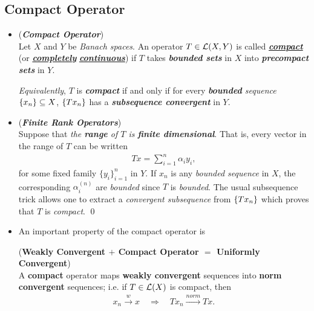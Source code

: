\documentclass[11pt]{article}
\begin{document}
\subsection{Compact Operator}
\begin{itemize}
\item \begin{definition} (\emph{\textbf{Compact Operator}})\\
Let $X$ and $Y$ be \emph{Banach spaces}. An operator $T \in {\mathcal L}(X, Y)$ is called \underline{\emph{\textbf{compact}}} (or \underline{\emph{\textbf{completely}}} \underline{\emph{\textbf{continuous}}}) if $T$ takes \emph{\textbf{bounded sets}} in $X$ into \emph{\textbf{precompact sets}} in $Y$. 

\emph{Equivalently}, $T$ is \emph{\textbf{compact}} if and only if for every \emph{\textbf{bounded} sequence} $\left\{x_n\right\} \subseteq X$, $\left\{T x_n\right\}$ has a \emph{\textbf{subsequence convergent}} in $Y$. 
\end{definition}

\item \begin{example} (\emph{\textbf{Finite Rank Operators}}) \\
Suppose that \emph{the \textbf{range} of $T$ is \textbf{finite  dimensional}}. That is, every vector in the range of $T$ can be written 
\begin{align*}
T x = \sum_{i=1}^{n}\alpha_i y_i,
\end{align*} for some fixed family $\{y_i\}_{i=1}^{n}$ in $Y$. If $x_n$ is any \emph{bounded sequence} in $X$, the corresponding $\alpha_i^{(n)}$ are \emph{bounded} since $T$ is \emph{bounded}. The usual subsequence trick allows one to extract a \emph{convergent subsequence} from $\left\{T x_n\right\}$ which proves that $T$ is \emph{compact}. \qed
\end{example}

\item An important property of the compact operator is 
\begin{theorem} (\textbf{Weakly Convergent $+$ Compact Operator $=$ Uniformly Convergent}) \citep{reed1980methods}\\
A \textbf{compact} operator maps \textbf{weakly convergent} sequences into \textbf{norm convergent} sequences; i.e. if $T \in {\mathcal L}(X)$ is compact, then
\begin{align*}
x_n \stackrel{w}{\rightarrow} x \quad \Rightarrow \quad Tx_{n} \stackrel{norm}{\rightarrow} Tx.
\end{align*}


\end{theorem}
\end{itemize}
\end{document}
